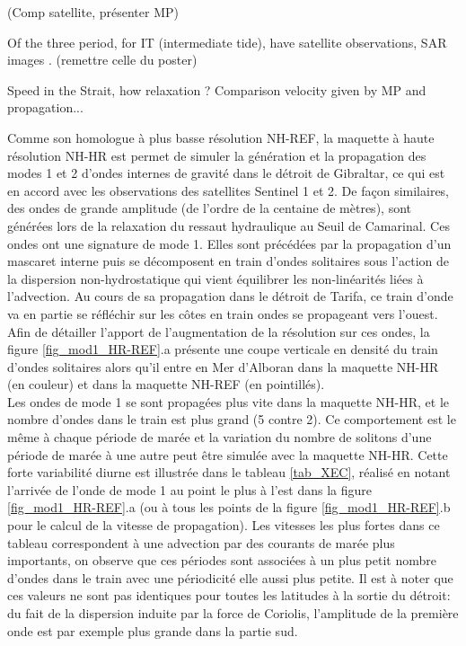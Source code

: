 (Comp satellite, présenter MP)

Of the three period, for IT (intermediate tide), have satellite observations, SAR images . (remettre celle du poster)



Speed in the Strait, how relaxation ? Comparison velocity given by MP and propagation...


Comme son homologue à plus basse résolution NH-REF, la maquette à haute résolution NH-HR est permet de simuler la génération et la propagation des modes 1 et 2 d'ondes internes de gravité dans le détroit de Gibraltar, ce qui est en accord avec les observations des satellites Sentinel 1 et 2. De façon similaires, des ondes de grande amplitude (de l'ordre de la centaine de mètres), sont générées lors de la relaxation du ressaut hydraulique au Seuil de Camarinal. Ces ondes ont une signature de mode 1. Elles sont précédées par la propagation d'un mascaret interne puis se décomposent en train d'ondes solitaires sous l'action de la dispersion non-hydrostatique qui vient équilibrer les non-linéarités liées à l'advection. Au cours de sa propagation dans le détroit de Tarifa, ce train d'onde va en partie se réfléchir sur les côtes en train ondes se propageant vers l'ouest. Afin de détailler l'apport de l'augmentation de la résolution sur ces ondes, la figure \ref{fig_mod1_HR-REF}.a présente une coupe verticale en densité du train d'ondes solitaires alors qu'il entre en Mer d'Alboran dans la maquette NH-HR (en couleur) et dans la maquette NH-REF (en pointillés). \\
Les ondes de mode 1 se sont propagées plus vite dans la maquette NH-HR, et le nombre d'ondes dans le train est plus grand (5 contre 2). Ce comportement est le même à chaque période de marée et la variation du nombre de solitons d'une période de marée à une autre peut être simulée avec la maquette NH-HR. Cette forte variabilité diurne est illustrée dans le tableau \ref{tab_XEC}, réalisé en notant l'arrivée de l'onde de mode 1 au point le plus à l'est dans la figure \ref{fig_mod1_HR-REF}.a (ou à tous les points de la figure \ref{fig_mod1_HR-REF}.b pour le calcul de la vitesse de propagation). Les vitesses les plus fortes dans ce tableau correspondent à une advection par des courants de marée plus importants, on observe que ces périodes sont associées à un plus petit nombre d'ondes dans le train avec une périodicité elle aussi plus petite. Il est à noter que ces valeurs ne sont pas identiques pour toutes les latitudes à la sortie du détroit: du fait de la dispersion induite par la force de Coriolis, l'amplitude de la première onde est par exemple plus grande dans la partie sud.


